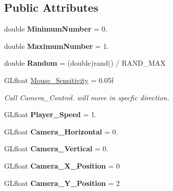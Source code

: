 \subsection*{Public Attributes}
\begin{DoxyCompactItemize}
\item 
\hypertarget{class_game_world_a54ccf4cf03172ab8779e9c326c8846ed}{}double {\bfseries Minimum\+Number} = 0.\label{class_game_world_a54ccf4cf03172ab8779e9c326c8846ed}

\item 
\hypertarget{class_game_world_a1cddcf233625a98581eaeb9fd7c8c574}{}double {\bfseries Maximum\+Number} = 1.\label{class_game_world_a1cddcf233625a98581eaeb9fd7c8c574}

\item 
\hypertarget{class_game_world_a56652cc9880b3ba1be61395066c863c3}{}double {\bfseries Random} = (double)rand() / R\+A\+N\+D\+\_\+\+M\+A\+X\label{class_game_world_a56652cc9880b3ba1be61395066c863c3}

\item 
G\+Lfloat \hyperlink{class_game_world_a9bf4eb977e6ab9299aaef1345c4fa4dd}{Mouse\+\_\+\+Sensitivity} = 0.\+05f
\begin{DoxyCompactList}\small\item\em Call Camera\+\_\+\+Control. will move in specfic direction. \end{DoxyCompactList}\item 
\hypertarget{class_game_world_ae8ab2ac372729cec44ea316f6bdf45ca}{}G\+Lfloat {\bfseries Player\+\_\+\+Speed} = 1.\label{class_game_world_ae8ab2ac372729cec44ea316f6bdf45ca}

\item 
\hypertarget{class_game_world_a7f4911dda9b3b4e4eb03ece87e16cd96}{}G\+Lfloat {\bfseries Camera\+\_\+\+Horizontal} = 0.\label{class_game_world_a7f4911dda9b3b4e4eb03ece87e16cd96}

\item 
\hypertarget{class_game_world_a26658e739c4d267b1be35ed820089931}{}G\+Lfloat {\bfseries Camera\+\_\+\+Vertical} = 0.\label{class_game_world_a26658e739c4d267b1be35ed820089931}

\item 
\hypertarget{class_game_world_ad07b1f650edb08ddb05e74a22588bda0}{}G\+Lfloat {\bfseries Camera\+\_\+\+X\+\_\+\+Position} = 0\label{class_game_world_ad07b1f650edb08ddb05e74a22588bda0}

\item 
\hypertarget{class_game_world_ae3e7cab30494ff5a8e91dfa7406deb16}{}G\+Lfloat {\bfseries Camera\+\_\+\+Y\+\_\+\+Position} = 2\label{class_game_world_ae3e7cab30494ff5a8e91dfa7406deb16}


\end{DoxyCompactItemize}
